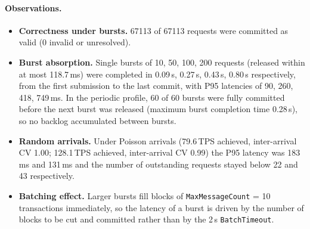 \paragraph{Observations.}
\begin{itemize}
  \item \textbf{Correctness under bursts.} 67113 of 67113 requests were committed as valid
        (0 invalid or unresolved).
  \item \textbf{Burst absorption.} Single bursts of 10, 50, 100, 200 requests (released within at most 118.7\,ms) were completed in 0.09\,s, 0.27\,s, 0.43\,s, 0.80\,s respectively, from the first submission to the last commit, with P95 latencies of 90, 260, 418, 749\,ms. In the periodic profile, 60 of 60 bursts were fully committed before the next burst was released (maximum burst completion time 0.28\,s), so no backlog accumulated between bursts.
  \item \textbf{Random arrivals.} Under Poisson arrivals (79.6\,TPS achieved, inter-arrival CV 1.00; 128.1\,TPS achieved, inter-arrival CV 0.99) the P95 latency was 183\,ms and 131\,ms and the number of outstanding requests stayed below 22 and 43 respectively.
  \item \textbf{Batching effect.} Larger bursts fill blocks of \texttt{MaxMessageCount} = 10 transactions immediately,
        so the latency of a burst is driven by the number of blocks to be cut and committed rather than by the
        2\,s \texttt{BatchTimeout}.
\end{itemize}
